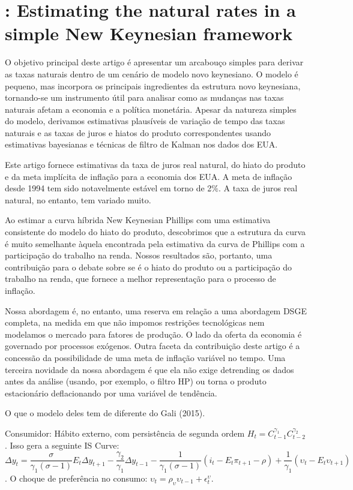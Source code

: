 \section{\citet{Bjornland:2011}: Estimating the natural rates in a simple New Keynesian framework  }

O objetivo principal deste artigo é apresentar um arcabouço simples para derivar as taxas naturais dentro de um cenário de modelo novo keynesiano. O modelo é pequeno, mas incorpora os principais ingredientes da estrutura novo keynesiana, tornando-se um instrumento útil para analisar como as mudanças nas taxas naturais afetam a economia e a política monetária. Apesar da natureza simples do modelo, derivamos estimativas plausíveis de variação de tempo das taxas naturais e as taxas de juros e hiatos do produto correspondentes usando estimativas bayesianas e técnicas de filtro de Kalman nos dados dos EUA.

Este artigo fornece estimativas da taxa de juros real natural, do hiato do produto e da meta implícita de inflação para a economia dos EUA. A meta de inflação desde 1994 tem sido notavelmente estável em torno de 2$\%$. A taxa de juros real natural, no entanto, tem variado muito.

Ao estimar a curva híbrida New Keynesian Phillips com uma estimativa consistente do modelo do hiato do produto, descobrimos que a estrutura da curva é muito semelhante àquela encontrada pela estimativa da curva de Phillips com a participação do trabalho na renda. Nossos resultados são, portanto, uma contribuição para o debate sobre se é o hiato do produto ou a participação do trabalho na renda, que fornece a melhor representação para o processo de inflação.

Nossa abordagem é, no entanto, uma reserva em relação a uma abordagem DSGE completa, na medida em que não impomos restrições tecnológicas nem modelamos o mercado para fatores de produção. O lado da oferta da economia é governado por processos exógenos. Outra faceta da contribuição deste artigo é a concessão da possibilidade de uma meta de inflação variável no tempo. Uma terceira novidade da nossa abordagem é que ela não exige detrending os dados antes da análise (usando, por exemplo, o filtro HP) ou torna o produto estacionário deflacionando por uma variável de tendência.

O que o modelo deles tem de diferente do Gali (2015).

Consumidor: Hábito externo, com persistência de segunda ordem $H_t = C_{t-1}^{\gamma_1}C_{t-2}^{\gamma_2}$. Isso gera a seguinte IS Curve: $\Delta y_t = \dfrac{\sigma}{\gamma_1(\sigma -1 )}E_t \Delta y_{t+1} - \dfrac{\gamma_2}{\gamma_1}\Delta y_{t-1} - \dfrac{1}{\gamma_1 (\sigma -1)}(i_t - E_t \pi_{t+1} - \rho) + \dfrac{1}{\gamma_1}(\upsilon_t - E_t \upsilon_{t+1}) $. O choque de preferência no consumo: $\upsilon_t = \rho_{\upsilon}\upsilon_{t-1} + \epsilon_t^{\upsilon} $. \\

